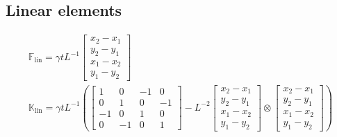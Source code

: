 \documentclass[a4paper,11pt]{article}
\newcommand{\ta}[1]{\text{\boldmath $#1$}} %
\newcommand{\uv}[1]{\mathbb{#1}}
\newcommand{\um}[1]{\mathbb{#1}}
\newcommand{\linear}{\mathrm{lin}}
\begin{document}
\subsection{Linear elements}
\begin{gather}
 \uv F_\linear = \gamma t L^{-1} \begin{bmatrix}x_2-x_1\\y_2-y_1\\x_1-x_2\\y_1-y_2\end{bmatrix}\\
 \um K_\linear = \gamma t L^{-1}\left(
	\begin{bmatrix}1&0&-1&0\\0&1&0&-1\\-1&0&1&0\\0&-1&0&1\end{bmatrix}-
	L^{-2}\begin{bmatrix}x_2-x_1\\y_2-y_1\\x_1-x_2\\y_1-y_2\end{bmatrix}\otimes\begin{bmatrix}x_2-x_1\\y_2-y_1\\x_1-x_2\\y_1-y_2\end{bmatrix}
  \right)
\end{gather}
\end{document}
